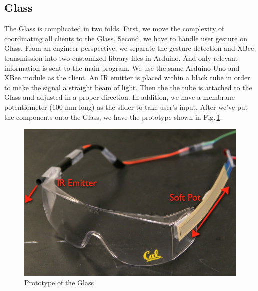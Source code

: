 \subsection{Glass}
\label{sec:glass}

The Glass is complicated in two folds. First, we move the complexity of coordinating all clients to the Glass. Second, we have to handle user gesture on Glass. From an engineer perspective, we separate the gesture detection and XBee transmission into two customized library files in Arduino. And only relevant information is sent to the main program. We use the same Arduino Uno and XBee module as the client. An IR emitter is placed within a black tube in order to make the signal a straight beam of light. Then the the tube is attached to the Glass and adjusted in a proper direction. In addition, we have a membrane potentiometer (100 mm long) as the slider to take user's input. After we've put the components onto the Glass, we have the prototype shown in Fig.\,\ref{fig:glass}.

\begin{figure}
  \centering
  \includegraphics[width=0.85\linewidth]{../figs/glass.png}
  \caption{Prototype of the Glass}
  \label{fig:glass}
\end{figure}


